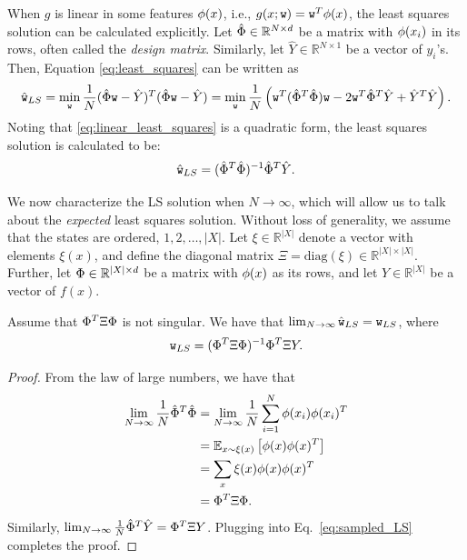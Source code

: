 When $g$ is linear in some features $\phi(x)$, i.e., $g(x;{\tt w}) = {\tt w}^T \phi(x)$, the least squares solution can be calculated explicitly. Let $\hat{\Phi} \in \mathbb{R}^{N \times d}$ be a matrix with $\phi(x_i)$ in its rows, often called the \textit{design matrix}. Similarly, let $\hat{Y}\in \mathbb{R}^{N \times 1}$ be a vector of $y_i$'s. Then, Equation \eqref{eq:least_squares} can be written as
\begin{equation}\label{eq:linear_least_squares}
\hat{{\tt w}}_{LS} = \min_{\tt w} \frac{1}{N} (\hat{\Phi} {\tt w} - \hat{Y})^T(\hat{\Phi} {\tt w} - \hat{Y}) = 
\min_{\tt w} \frac{1}{N} \left( {\tt w}^T (\hat{\Phi}^T \hat{\Phi}) {\tt w} -2 {\tt w}^T \hat{\Phi}^T \hat{Y} + \hat{Y}^T\hat{Y} \right).
\end{equation}
Noting that \eqref{eq:linear_least_squares} is a quadratic form, the least squares solution is calculated to be: 
\begin{equation}\label{eq:sampled_LS}
    \hat{{\tt w}}_{LS} = (\hat{\Phi}^T \hat{\Phi})^{-1} \hat{\Phi}^T \hat{Y}.
\end{equation}

We now characterize the LS solution when $N \to \infty$, which  will allow us to talk about the \textit{expected} least squares solution. Without loss of generality, we assume that the states are ordered, $1,2,\dots,|X|$. Let $\xi\in \mathbb{R}^{|X|}$ denote a vector with elements $\xi(x)$, and define the diagonal matrix
$\Xi = \text{diag}(\xi)\in\mathbb{R}^{|X| \times |X|}$. Further, let $\Phi \in \mathbb{R}^{|X| \times d}$ be a matrix with $\phi(x)$ as its rows, and let $Y\in \mathbb{R}^{|X|}$ be a vector of $f(x)$.


\begin{proposition}
Assume that $\Phi^T \Xi \Phi$ is not singular. We have that $\lim_{N \to \infty} \hat{{\tt w}}_{LS} = {\tt w}_{LS}$, where
\begin{equation*}
    {\tt w}_{LS} = (\Phi^T \Xi \Phi)^{-1} \Phi^T \Xi Y.
\end{equation*}
\end{proposition}

\begin{proof}
From the law of large numbers, we have that 
\begin{equation*}
\begin{split}
    \lim_{N \to \infty}\frac{1}{N}\hat{\Phi}^T \hat{\Phi} &= \lim_{N \to \infty}\frac{1}{N} \sum_{i=1}^N \phi(x_i) \phi(x_i)^T \\
    &= \mathbb{E}_{x \sim \xi(x)}\left[ \phi(x) \phi(x)^T \right] \\
    &= \sum_{x} \xi(x) \phi(x) \phi(x)^T \\
    &= \Phi^T \Xi \Phi.
\end{split}
\end{equation*}
Similarly, $\lim_{N \to \infty}\frac{1}{N} \hat{\Phi}^T \hat{Y} = \Phi^T \Xi Y$. Plugging into Eq.~\eqref{eq:sampled_LS} completes the proof.
\end{proof}

